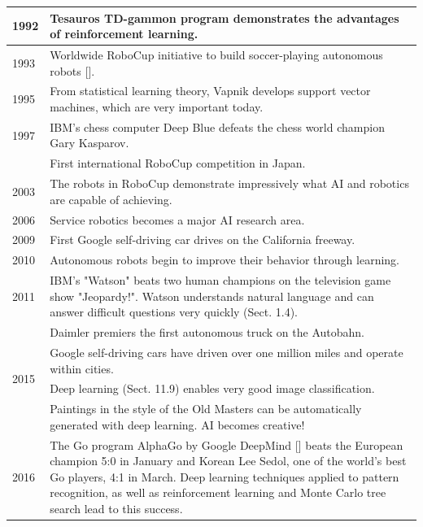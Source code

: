 \documentclass[10pt]{article}
\begin{document}
\begin{center}
\begin{tabular}{|l|l|}
\hline
1992 & Tesauros TD-gammon program demonstrates the advantages of reinforcement learning. \\
\hline
1993 & Worldwide RoboCup initiative to build soccer-playing autonomous robots [\cite{robocup_site}]. \\
\hline
1995 & From statistical learning theory, Vapnik develops support vector machines, which are very important today. \\
\hline
1997 & IBM's chess computer Deep Blue defeats the chess world champion Gary Kasparov. \\
\hline
 & First international RoboCup competition in Japan. \\
\hline
2003 & The robots in RoboCup demonstrate impressively what AI and robotics are capable of achieving. \\
\hline
2006 & Service robotics becomes a major AI research area. \\
\hline
2009 & First Google self-driving car drives on the California freeway. \\
\hline
2010 & Autonomous robots begin to improve their behavior through learning. \\
\hline
2011 & IBM's "Watson" beats two human champions on the television game show "Jeopardy!". Watson understands natural language and can answer difficult questions very quickly (Sect. 1.4). \\
\hline
\multirow[t]{4}{*}{2015} & Daimler premiers the first autonomous truck on the Autobahn. \\
\hline
 & Google self-driving cars have driven over one million miles and operate within cities. \\
\hline
 & Deep learning (Sect. 11.9) enables very good image classification. \\
\hline
 & Paintings in the style of the Old Masters can be automatically generated with deep learning. AI becomes creative! \\
\hline
2016 & The Go program AlphaGo by Google DeepMind [\cite{silver2016mastering}] beats the European champion 5:0 in January and Korean Lee Sedol, one of the world's best Go players, 4:1 in March. Deep learning techniques applied to pattern recognition, as well as reinforcement learning and Monte Carlo tree search lead to this success. \\
\hline
\end{tabular}
\end{center}
\end{document}
